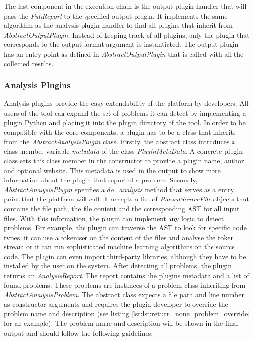 The last component in the execution chain is the output plugin handler that will pass the \textit{FullReport} to the specified output plugin. It implements the same algorithm as the analysis plugin handler to find all plugins that inherit from \textit{AbstractOutputPlugin}. Instead of keeping track of all plugins, only the plugin that corresponds to the output format argument is instantiated. The output plugin has an entry point as defined in \textit{AbstractOutputPlugin}  that is called with all the collected results.

\subsubsection{Analysis Plugins}\label{sec:analysis_plugins}
Analysis plugins provide the easy extendability of the platform by developers. All users of the tool can expand the set of problems it can detect by implementing a plugin Python and placing it into the plugin directory of the tool. In order to be compatible with the core components, a plugin has to be a class that inherits from the \textit{AbstractAnalysisPlugin} class. Firstly, the abstract class introduces a class member variable \textit{metadata} of the class \textit{PluginMetaData}. A concrete plugin class sets this class member in the constructor to provide a plugin name, author and optional website. This metadata is used in the output to show more information about the plugin that reported a problem. Secondly, \textit{AbstractAnalysisPlugin} specifies a \textit{do\_analysis} method that serves as a entry point that the platform will call. It accepts a list of \textit{ParsedSourceFile} objects that contains the file path, the file content and the corresponding AST for all input files. With this information, the plugin can implement any logic to detect problems. 
For example, the plugin can traverse the AST to look for specific node types, it can use a tokeniser on the content of the files and analyse the token stream or it can run sophisticated machine learning algorithms on the source code.
The plugin can even import third-party libraries, although they have to be installed by the user on the system. After detecting all problems, the plugin returns an \textit{AnalysisReport}. The report contains the plugins metadata and a list of found problems. These problems are instances of a problem class inheriting from \textit{AbstractAnalysisProblem}. The abstract class expects a file path and line number as constructor arguments and requires the plugin developer to override the problem name and description (see listing \ref{lst:lst:return_none_problem_override} for an example). The problem name and description will be shown in the final output and should follow the following guidelines:

